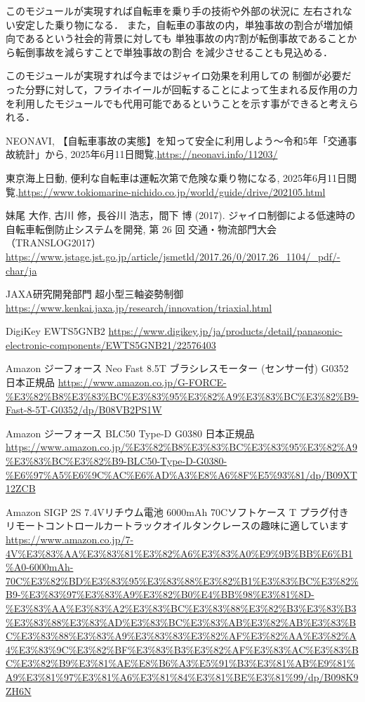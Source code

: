 \documentclass[uplatex,dvipdfmx]{jsarticle}
\begin{document}
このモジュールが実現すれば自転車を乗り手の技術や外部の状況に
左右されない安定した乗り物になる．
また，自転車の事故の内，単独事故の割合が増加傾向であるという社会的背景に対しても
単独事故の内7割が転倒事故であることから転倒事故を減らすことで単独事故の割合
を減少させることも見込める．

このモジュールが実現すれば今まではジャイロ効果を利用しての
制御が必要だった分野に対して，フライホイールが回転することによって生まれる反作用の力
を利用したモジュールでも代用可能であるということを示す事ができると考えられる．


\begin{thebibliography}{11}

 NEONAVI, 【自転車事故の実態】を知って安全に利用しよう～令和5年「交通事故統計」から, 
2025年6月11日閲覧,\url{https://neonavi.info/11203/}

 東京海上日動, 便利な自転車は運転次第で危険な乗り物になる, 
2025年6月11日閲覧,\url{https://www.tokiomarine-nichido.co.jp/world/guide/drive/202105.html}

 妹尾 大作, 古川 修，長谷川 浩志，間下 博 (2017). ジャイロ制御による低速時の
自転車転倒防止システムを開発, 第 26 回 交通・物流部門大会（TRANSLOG2017） 
\url{https://www.jstage.jst.go.jp/article/jsmetld/2017.26/0/2017.26_1104/_pdf/-char/ja}

JAXA研究開発部門 超小型三軸姿勢制御 
\url{https://www.kenkai.jaxa.jp/research/innovation/triaxial.html}


DigiKey EWTS5GNB2  \url{https://www.digikey.jp/ja/products/detail/panasonic-electronic-components/EWTS5GNB21/22576403}

Amazon ジーフォース Neo Fast 8.5T ブラシレスモーター (センサー付) G0352 日本正規品 \url{https://www.amazon.co.jp/G-FORCE-%E3%82%B8%E3%83%BC%E3%83%95%E3%82%A9%E3%83%BC%E3%82%B9-Fast-8-5T-G0352/dp/B08VB2PS1W}

Amazon ジーフォース BLC50 Type-D G0380 日本正規品
\url{https://www.amazon.co.jp/%E3%82%B8%E3%83%BC%E3%83%95%E3%82%A9%E3%83%BC%E3%82%B9-BLC50-Type-D-G0380-%E6%97%A5%E6%9C%AC%E6%AD%A3%E8%A6%8F%E5%93%81/dp/B09XT12ZCB}

Amazon SIGP 2S 7.4Vリチウム電池 6000mAh 70Cソフトケース T プラグ付き リモートコントロールカートラックオイルタンクレースの趣味に適しています
\url{https://www.amazon.co.jp/7-4V%E3%83%AA%E3%83%81%E3%82%A6%E3%83%A0%E9%9B%BB%E6%B1%A0-6000mAh-70C%E3%82%BD%E3%83%95%E3%83%88%E3%82%B1%E3%83%BC%E3%82%B9-%E3%83%97%E3%83%A9%E3%82%B0%E4%BB%98%E3%81%8D-%E3%83%AA%E3%83%A2%E3%83%BC%E3%83%88%E3%82%B3%E3%83%B3%E3%83%88%E3%83%AD%E3%83%BC%E3%83%AB%E3%82%AB%E3%83%BC%E3%83%88%E3%83%A9%E3%83%83%E3%82%AF%E3%82%AA%E3%82%A4%E3%83%9C%E3%82%BF%E3%83%B3%E3%82%AF%E3%83%AC%E3%83%BC%E3%82%B9%E3%81%AE%E8%B6%A3%E5%91%B3%E3%81%AB%E9%81%A9%E3%81%97%E3%81%A6%E3%81%84%E3%81%BE%E3%81%99/dp/B098K9ZH6N}


\end{thebibliography}
\end{document}
